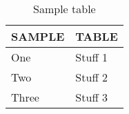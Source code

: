 \begin{table}[!ht]
\centering
\caption{Sample table}
~\\
\label{tab:sample-table-label}
\begin{tabular}{p{} p{}}
\toprule
\textbf{SAMPLE}		  & \textbf{TABLE}                                                                                                                                                  \\ \toprule
One                   & Stuff 1 \\
\midrule
Two                   & Stuff 2 \\
\midrule
Three                 & Stuff 3\\
\bottomrule
\end{tabular}
\end{table}

